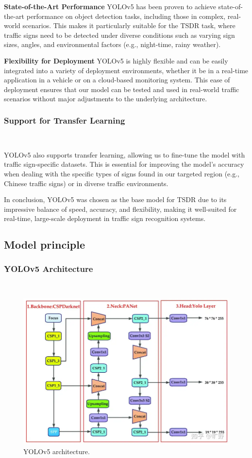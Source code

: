 \documentclass[letterpaper, 10 pt, conference]{ieeeconf}
\begin{document}
\textbf{State-of-the-Art Performance}
YOLOv5 has been proven to achieve state-of-the-art performance on object detection tasks, including those in complex, real-world scenarios. This makes it particularly suitable for the TSDR task, where traffic signs need to be detected under diverse conditions such as varying sign sizes, angles, and environmental factors (e.g., night-time, rainy weather).

\textbf{Flexibility for Deployment}
YOLOv5 is highly flexible and can be easily integrated into a variety of deployment environments, whether it be in a real-time application in a vehicle or on a cloud-based monitoring system. This ease of deployment ensures that our model can be tested and used in real-world traffic scenarios without major adjustments to the underlying architecture.

\subsubsection{Support for Transfer Learning}\

YOLOv5 also supports transfer learning, allowing us to fine-tune the model with traffic sign-specific datasets. This is essential for improving the model's accuracy when dealing with the specific types of signs found in our targeted region (e.g., Chinese traffic signs) or in diverse traffic environments.
    
In conclusion, YOLOv5 was chosen as the base model for TSDR due to its impressive balance of speed, accuracy, and flexibility, making it well-suited for real-time, large-scale deployment in traffic sign recognition systems.

\subsection{Model principle}

\subsubsection{YOLOv5 Architecture}\

\begin{figure}[!t]
    \centering
    \includegraphics[width=0.9\linewidth]{figures/yolov5.png} 
    \caption{YOLOv5 architecture.}
    \label{fig:yolov5}
\end{figure}
\end{document}
